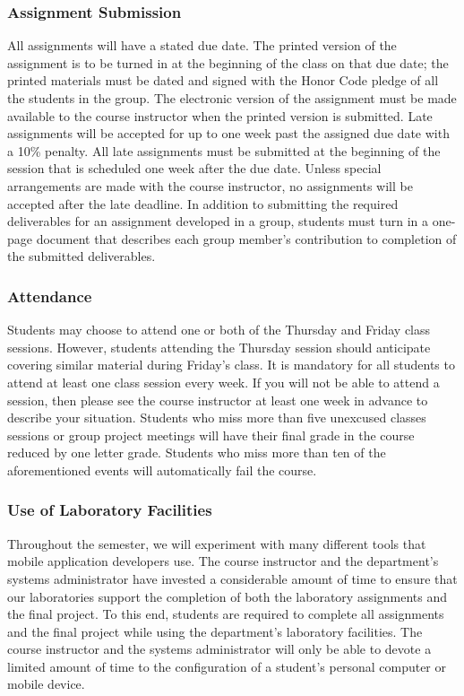 \subsubsection*{Assignment Submission}

All assignments will have a stated due date. The printed version of the assignment is to be turned in at the beginning
of the class on that due date; the printed materials must be dated and signed with the Honor Code pledge of all the
students in the group.  The electronic version of the assignment must be made available to the course instructor when
the printed version is submitted. Late assignments will be accepted for up to one week past the assigned due date with a
10\% penalty. All late assignments must be submitted at the beginning of the session that is scheduled one week after
the due date. Unless special arrangements are made with the course instructor, no assignments will be accepted after the
late deadline. In addition to submitting the required deliverables for an assignment developed in a group, students must
turn in a one-page document that describes each group member's contribution to completion of the submitted deliverables.  

\subsubsection*{Attendance}

Students may choose to attend one or both of the Thursday and Friday class sessions.  However, students attending the
Thursday session should anticipate covering similar material during Friday's class.  It is mandatory for all students to
attend at least one class session every week. If you will not be able to attend a session, then please see the course
instructor at least one week in advance to describe your situation.  Students who miss more than five unexcused classes
sessions or group project meetings will have their final grade in the course reduced by one letter grade.  Students who
miss more than ten of the aforementioned events will automatically fail the course.

\subsubsection*{Use of Laboratory Facilities}

Throughout the semester, we will experiment with many different tools that mobile application developers use.  The
course instructor and the department's systems administrator have invested a considerable amount of time to ensure that
our laboratories support the completion of both the laboratory assignments and the final project.  To this end, students
are required to complete all assignments and the final project while using the department's laboratory facilities. The
course instructor and the systems administrator will only be able to devote a limited amount of time to the
configuration of a student's personal computer or mobile device.

